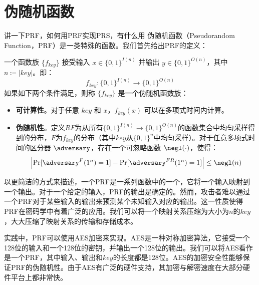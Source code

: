 \section{伪随机函数}
{讲一下PRF，如何用PRF实现PRS，有什么用}
伪随机函数（Pseudorandom Function，PRF）是一类特殊的函数。我们首先给出PRF的定义：
\begin{definition}[伪随机函数族]
    一个函数族 $\{f_{key}\}$ 接受输入 $x\in\{0,1\}^{I(n)}$ 并输出 $y\in\{0,1\}^{O(n)}$，其中 $n \coloneqq |key|$。即：
    $$ f_{key}: \{0,1\}^{I(n)} \rightarrow \{0,1\}^{O(n)}$$
    如果如下两个条件满足，则称 $\{f_{key}\}$ 是一个伪随机函数族：
    \begin{itemize}
        \item \textbf{可计算性}。对于任意 $key$ 和 $x$，$f_{key}(x)$ 可以在多项式时间内计算。
        \item \textbf{伪随机性}。定义$RF$为从所有$\{0,1\}^{I(n)} \rightarrow \{0,1\}^{O(n)}$的函数集合中均匀采样得到的分布，$F$为$f_{key}$的分布（其中$key$从$\{0,1\}^{n}$中均匀采样）。对于任意多项式时间的区分器 $\adversary$，存在一个可忽略函数 $\negl(\cdot)$，使得：
        $$\left| \Pr[\adversary^{F}(1^n) = 1] - \Pr[\adversary^{FR}(1^n) = 1] \right| \le \negl(n)$$
    \end{itemize}
\end{definition}

以更简洁的方式来描述，一个PRF是一系列函数中的一个，它将一个输入映射到一个输出。对于一个给定的输入，PRF的输出是确定的。然而，攻击者难以通过一个PRF对于某些输入的输出来预测某个未知输入对应的输出。这一性质使得PRF在密码学中有着广泛的应用。我们可以将一个映射关系压缩为大小为$n$的$key$，大大压缩了映射关系的传输和存储成本。

实践中，PRF可以使用AES加密来实现。AES是一种对称加密算法，它接受一个128位的输入和一个128位的密钥，并输出一个128位的输出。我们可以将AES看作是一个PRF，其中输入、输出和$key$的长度都是128位。AES的加密安全性能够保证PRF的伪随机性。由于AES有广泛的硬件支持，其加密与解密速度在大部分硬件平台上都非常快。